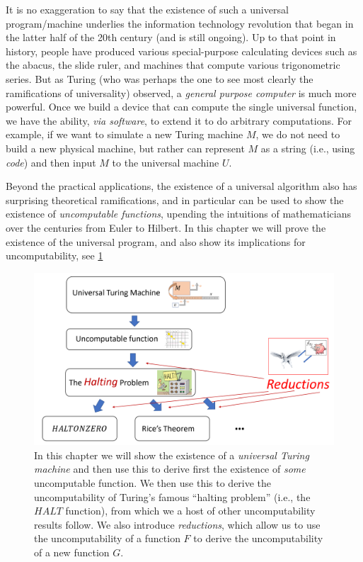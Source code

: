 It is no exaggeration to say that the existence of such a universal
program/machine underlies the information technology revolution that
began in the latter half of the 20th century (and is still ongoing). Up
to that point in history, people have produced various special-purpose
calculating devices such as the abacus, the slide ruler, and machines
that compute various trigonometric series. But as Turing (who was
perhaps the one to see most clearly the ramifications of universality)
observed, a \emph{general purpose computer} is much more powerful. Once
we build a device that can compute the single universal function, we
have the ability, \emph{via software}, to extend it to do arbitrary
computations. For example, if we want to simulate a new Turing machine
\(M\), we do not need to build a new physical machine, but rather can
represent \(M\) as a string (i.e., using \emph{code}) and then input
\(M\) to the universal machine \(U\).

Beyond the practical applications, the existence of a universal
algorithm also has surprising theoretical ramifications, and in
particular can be used to show the existence of \emph{uncomputable
functions}, upending the intuitions of mathematicians over the centuries
from Euler to Hilbert. In this chapter we will prove the existence of
the universal program, and also show its implications for
uncomputability, see \cref{universalchapoverviewfig}


\begin{figure}
\centering
\includegraphics[width=\textwidth, height=0.25\paperheight, keepaspectratio]{../figure/universalchapoverview.png}
\caption{In this chapter we will show the existence of a \emph{universal
Turing machine} and then use this to derive first the existence of
\emph{some} uncomputable function. We then use this to derive the
uncomputability of Turing's famous ``halting problem'' (i.e., the
\(\ensuremath{\mathit{HALT}}\) function), from which we a host of other
uncomputability results follow. We also introduce \emph{reductions},
which allow us to use the uncomputability of a function \(F\) to derive
the uncomputability of a new function \(G\).}
\label{universalchapoverviewfig}
\end{figure}

